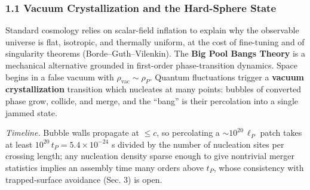 \documentclass[
]{article}
\begin{document}
\hypertarget{vacuum-crystallization-and-the-hard-sphere-state}{%
\subsubsection{\texorpdfstring{\textbf{1.1 Vacuum Crystallization and
the Hard-Sphere
State}}{1.1 Vacuum Crystallization and the Hard-Sphere State}}\label{vacuum-crystallization-and-the-hard-sphere-state}}

Standard cosmology relies on scalar-field inflation to explain why the
observable universe is flat, isotropic, and thermally uniform, at the
cost of fine-tuning and of singularity theorems (Borde--Guth--Vilenkin).
The \textbf{Big Pool Bangs Theory} is a mechanical alternative grounded
in first-order phase-transition dynamics. Space begins in a false vacuum
with \(\rho_{\text{vac}} \sim \rho_P\). Quantum fluctuations trigger a
\textbf{vacuum crystallization} transition which nucleates at many
points: bubbles of converted phase grow, collide, and merge, and the
``bang'' is their percolation into a single jammed state.

\emph{Timeline.} Bubble walls propagate at \(\leq c\), so percolating a
\(\sim\!10^{20}\,\ell_P\) patch takes at least
\(10^{20}\,t_P = 5.4\times10^{-24}\) s divided by the number of
nucleation sites per crossing length; any nucleation density sparse
enough to give nontrivial merger statistics implies an assembly time
many orders above \(t_P\), whose consistency with trapped-surface
avoidance (Sec. 3) is open.
\end{document}
